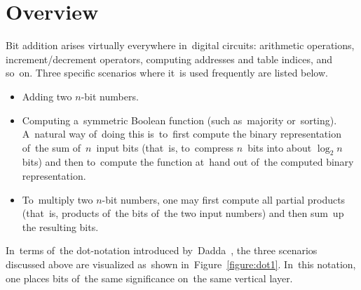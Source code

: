 \documentclass[a4paper, UKenglish, cleveref, autoref,  thm-restate, anonymous]{lipics-v2021}
\begin{document}
    \section{Overview}
    Bit addition arises virtually everywhere in~digital circuits:
    arithmetic operations,
    increment/decrement operators,
    computing addresses and table indices, and so~on.
    Three specific scenarios where it~is used frequently are listed below.
    \begin{itemize}
        \item Adding two $n$-bit numbers.
        \item Computing a~symmetric Boolean function
        (such as~majority or~sorting).
        A~natural way of~doing this is~to~first compute
        the binary representation of~the sum of~$n$~input bits
        (that~is, to~compress $n$~bits into about $\log_2 n$ bits)
        and then to~compute the function at~hand
        out of~the computed binary representation.
        \item To~multiply two $n$-bit numbers, one may first compute
        all partial products (that~is, products of~the bits of~the
        two input numbers) and then sum~up the resulting bits.
    \end{itemize}
    In~terms of~the dot-notation introduced by~Dadda~\cite{dadda}, the three scenarios discussed above are visualized as~shown in~Figure~\ref{figure:dot1}. In~this notation, one places
    bits of~the same significance on~the same vertical layer.
\end{document}

